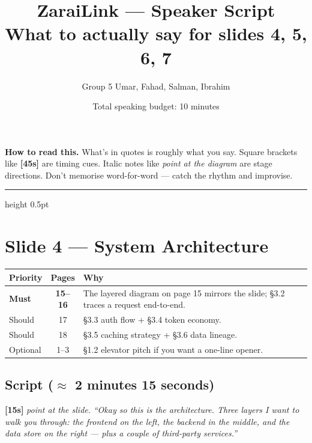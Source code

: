 \documentclass[11pt,a4paper]{article}
\title{\color{navy}\bfseries ZaraiLink --- Speaker Script \\[0.3em] \large What to actually say for slides 4, 5, 6, 7}
\author{Group 5 \quad\textbar\quad Umar, Fahad, Salman, Ibrahim}
\date{Total speaking budget: 10 minutes}
\newcommand{\beat}[1]{\textcolor{accent}{\textbf{[#1]}}}
\newcommand{\stage}[1]{{\itshape\color{stageborder}#1}}
\begin{document}
\maketitle

\begin{stagebox}
\textbf{How to read this.} What's in quotes is roughly what you say. Square brackets like \beat{45s} are timing cues. Italic notes like \stage{point at the diagram} are stage directions. Don't memorise word-for-word --- catch the rhythm and improvise.
\end{stagebox}

\hrule height 0.5pt
\vspace{0.5em}

\section{Slide 4 --- System Architecture}

\begin{readbox}
\begin{tabularx}{\linewidth}{l c X}
\toprule
\textbf{Priority} & \textbf{Pages} & \textbf{Why} \\
\midrule
\textbf{Must}     & \textbf{15--16} & The layered diagram on page 15 mirrors the slide; \S3.2 traces a request end-to-end. \\
Should            & 17             & \S3.3 auth flow + \S3.4 token economy. \\
Should            & 18             & \S3.5 caching strategy + \S3.6 data lineage. \\
Optional          & 1--3           & \S1.2 elevator pitch if you want a one-line opener. \\
\bottomrule
\end{tabularx}
\end{readbox}

\subsection*{Script ($\approx$ 2 minutes 15 seconds)}

\beat{15s} \stage{point at the slide.}
\textit{``Okay so this is the architecture. Three layers I want to walk you through: the frontend on the left, the backend in the middle, and the data store on the right --- plus a couple of third-party services.''}
\end{document}
